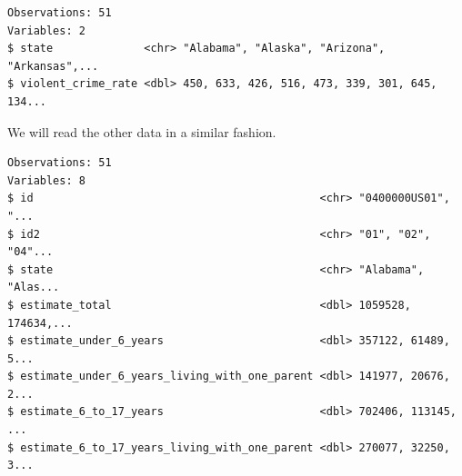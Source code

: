 \documentclass[]{book}
\newenvironment{Shaded}{\begin{snugshade}}{\end{snugshade}}
\newcommand{\CommentTok}[1]{\textcolor[rgb]{0.56,0.35,0.01}{\textit{#1}}}
\newcommand{\DataTypeTok}[1]{\textcolor[rgb]{0.13,0.29,0.53}{#1}}
\newcommand{\DecValTok}[1]{\textcolor[rgb]{0.00,0.00,0.81}{#1}}
\newcommand{\KeywordTok}[1]{\textcolor[rgb]{0.13,0.29,0.53}{\textbf{#1}}}
\newcommand{\NormalTok}[1]{#1}
\newcommand{\OperatorTok}[1]{\textcolor[rgb]{0.81,0.36,0.00}{\textbf{#1}}}
\newcommand{\StringTok}[1]{\textcolor[rgb]{0.31,0.60,0.02}{#1}}
\begin{document}
\begin{Shaded}
\end{Shaded}

\begin{verbatim}
Observations: 51
Variables: 2
$ state              <chr> "Alabama", "Alaska", "Arizona", "Arkansas",...
$ violent_crime_rate <dbl> 450, 633, 426, 516, 473, 339, 301, 645, 134...
\end{verbatim}

We will read the other data in a similar fashion.

\begin{Shaded}
\end{Shaded}

\begin{verbatim}
Observations: 51
Variables: 8
$ id                                            <chr> "0400000US01", "...
$ id2                                           <chr> "01", "02", "04"...
$ state                                         <chr> "Alabama", "Alas...
$ estimate_total                                <dbl> 1059528, 174634,...
$ estimate_under_6_years                        <dbl> 357122, 61489, 5...
$ estimate_under_6_years_living_with_one_parent <dbl> 141977, 20676, 2...
$ estimate_6_to_17_years                        <dbl> 702406, 113145, ...
$ estimate_6_to_17_years_living_with_one_parent <dbl> 270077, 32250, 3...
\end{verbatim}
\end{document}
